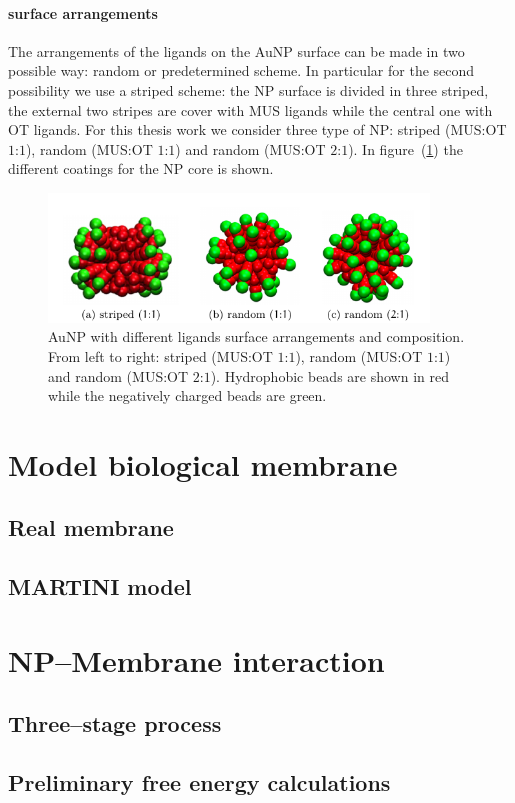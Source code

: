 \paragraph{\textbf{surface arrangements}} The arrangements of the ligands on the Au\ac{NP} surface can be made in two possible way: random or predetermined scheme. In particular for the second possibility we use a striped scheme: the \ac{NP} surface is divided in three striped, the external two stripes are cover with \ac{MUS} ligands while the central one with \ac{OT} ligands. For this thesis work we consider three type of \ac{NP}: striped (\ac{MUS}:\ac{OT} $1$:$1$), random (\ac{MUS}:\ac{OT} $1$:$1$) and random (\ac{MUS}:\ac{OT} $2$:$1$). In figure~(\ref{fig:coating}) the different coatings for the \ac{NP} core is shown.

\begin{figure}[!ht]
	\centering
	\includegraphics[width=0.9\textwidth]{./img/coatings/coat}
	\caption{Au\acs{NP} with different ligands surface arrangements and composition. From left to right: striped (\ac{MUS}:\ac{OT} $1$:$1$), random (\ac{MUS}:\ac{OT} $1$:$1$) and random (\ac{MUS}:\ac{OT} $2$:$1$). Hydrophobic beads are shown in red while the negatively charged beads are green.}
	\label{fig:coating}
\end{figure}


\section{Model biological membrane}

\subsection{Real membrane}

\subsection{MARTINI model}

\section{NP--Membrane interaction}

\subsection{Three--stage process}

\subsection{Preliminary free energy calculations}